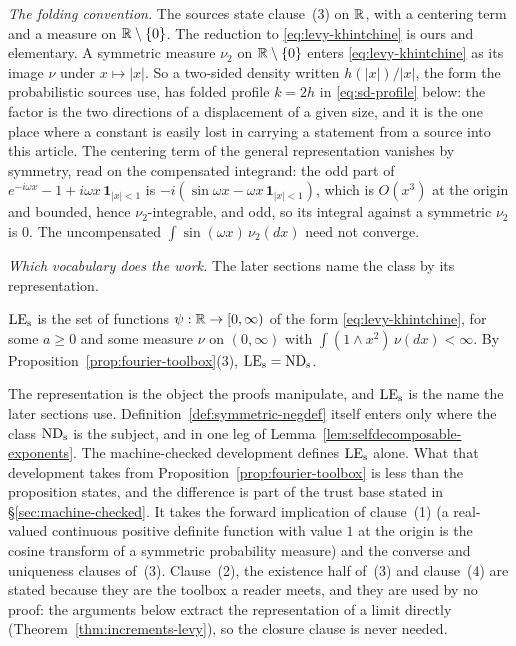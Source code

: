 \emph{The folding convention.} The sources state clause~(3) on $\mathbb{R}$, with a centering term
and a \Levy{} measure on $\mathbb{R} \setminus \{0\}$. The reduction to \ref{eq:levy-khintchine} is
ours and elementary. A symmetric \Levy{} measure $\nu_2$ on $\mathbb{R} \setminus \{0\}$ enters
\ref{eq:levy-khintchine} as its image $\nu$ under $x \mapsto |x|$. So a two-sided \Levy{}
density written $h(|x|)/|x|$, the form the probabilistic sources use, has folded profile
$k = 2h$ in \ref{eq:sd-profile} below: the factor is the two directions of a displacement
of a given size, and it is the one place where a constant is easily lost in carrying a
statement from a source into this article. The centering term of the general representation
vanishes by symmetry, read on the compensated integrand: the odd part of
$e^{-i\omega x} - 1 + i\omega x\,\mathbf 1_{|x| < 1}$ is $-i(\sin\omega x - \omega x\,\mathbf
1_{|x|<1})$, which is $O(x^3)$ at the origin and bounded, hence $\nu_2$-integrable, and odd,
so its integral against a symmetric $\nu_2$ is $0$. The uncompensated
$\int \sin(\omega x)\,\nu_2(dx)$ need not converge.

\emph{Which vocabulary does the work.} The later sections name the class by its
representation.

\begin{definition}\label{def:levy-exponents}
$\mathrm{LE}_{\mathrm{s}}$ is the set of functions $\psi : \mathbb{R} \to [0,\infty)$ of the form
\ref{eq:levy-khintchine}, for some $a \ge 0$ and some measure $\nu$ on $(0,\infty)$ with
$\int (1 \wedge x^2)\,\nu(dx) < \infty$. By Proposition~\ref{prop:fourier-toolbox}(3),
$\mathrm{LE}_{\mathrm{s}} = \mathrm{ND}_{\mathrm{s}}$.
\end{definition}

The representation is the object the proofs manipulate, and $\mathrm{LE}_{\mathrm{s}}$ is the name the later
sections use. Definition~\ref{def:symmetric-negdef} itself enters only where the class
$\mathrm{ND}_{\mathrm{s}}$ is the subject, and in one leg of Lemma~\ref{lem:selfdecomposable-exponents}. The
machine-checked development defines $\mathrm{LE}_{\mathrm{s}}$ alone. What that development takes from
Proposition~\ref{prop:fourier-toolbox} is less than the proposition states, and the
difference is part of the trust base stated in \S\ref{sec:machine-checked}. It takes the
forward implication of clause~(1) (a real-valued continuous positive definite function with
value $1$ at the origin is the cosine transform of a symmetric probability measure) and the
converse and
uniqueness clauses of~(3). Clause~(2), the existence half of~(3) and clause~(4) are stated
because they are the toolbox a reader meets, and they are used by no proof: the arguments
below extract the representation of a limit directly (Theorem~\ref{thm:increments-levy}),
so the closure clause is never needed.

